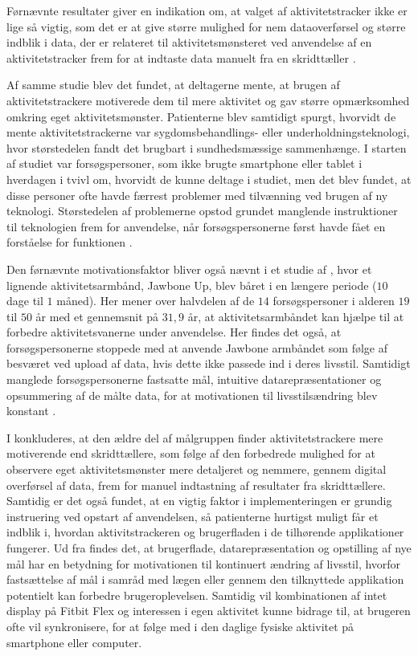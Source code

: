 Førnævnte resultater giver en indikation om, at valget af aktivitetstracker ikke er lige så vigtig, som det er at give større mulighed for nem dataoverførsel og større indblik i data, der er relateret til aktivitetsmønsteret ved anvendelse af en aktivitetstracker frem for at indtaste data manuelt fra en skridttæller \citep{mercer2016}.

Af samme studie blev det fundet, at deltagerne mente, at brugen af aktivitetstrackere motiverede dem til mere aktivitet og gav større opmærksomhed omkring eget aktivitetsmønster. Patienterne blev samtidigt spurgt, hvorvidt de mente aktivitetstrackerne var sygdomsbehandlings- eller underholdningsteknologi, hvor størstedelen fandt det brugbart i sundhedsmæssige sammenhænge. I starten af studiet var forsøgspersoner, som ikke brugte smartphone eller tablet i hverdagen i tvivl om, hvorvidt de kunne deltage i studiet, men det blev fundet, at disse personer ofte havde færrest problemer med tilvænning ved brugen af ny teknologi. Størstedelen af problemerne opstod grundet manglende instruktioner til teknologien frem for anvendelse, når forsøgspersonerne først havde fået en forståelse for funktionen \citep{mercer2016}.

Den førnævnte motivationsfaktor bliver også nævnt i et studie af \citeauthor{rapp2016}, hvor et lignende aktivitetsarmbånd, Jawbone Up, blev båret i en længere periode ($10$ dage til $1$ måned). Her mener over halvdelen af de $14$ forsøgspersoner i alderen $19$ til $50$ år med et gennemsnit på $31,9$ år, at aktivitetsarmbåndet kan hjælpe til at forbedre aktivitetsvanerne under anvendelse. Her findes det også, at forsøgspersonerne stoppede med at anvende Jawbone armbåndet som følge af besværet ved upload af data, hvis dette ikke passede ind i deres livsstil. Samtidigt manglede forsøgspersonerne fastsatte mål, intuitive datarepræsentationer og opsummering af de målte data, for at motivationen til livsstilsændring blev konstant \citep{rapp2016}.

I \citeauthor{mercer2016} konkluderes, at den ældre del af målgruppen finder aktivitetstrackere mere motiverende end skridttællere, som følge af den forbedrede mulighed for at observere eget aktivitetsmønster mere detaljeret og nemmere, gennem digital overførsel af data, frem for manuel indtastning af resultater fra skridttællere. Samtidig er det også fundet, at en vigtig faktor i implementeringen er grundig instruering ved opstart af anvendelsen, så patienterne hurtigst muligt får et indblik i, hvordan aktivitstrackeren og brugerfladen i de tilhørende applikationer fungerer. Ud fra \citeauthor{rapp2016} findes det, at brugerflade, datarepræsentation og opstilling af nye mål har en betydning for motivationen til kontinuert ændring af livsstil, hvorfor fastsættelse af mål i samråd med lægen eller gennem den tilknyttede applikation potentielt kan forbedre brugeroplevelsen. Samtidig vil kombinationen af intet display på Fitbit Flex og interessen i egen aktivitet kunne bidrage til, at brugeren ofte vil synkronisere, for at følge med i den daglige fysiske aktivitet på smartphone eller computer.